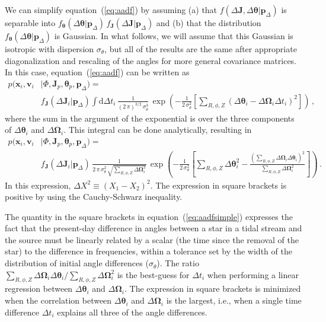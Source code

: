 \documentclass[12pt,preprint]{aastex}
\newcommand{\ie}{i.e.}
\newcommand{\dd}{\mathrm{d}}
\newcommand{\eqnname}{equation}
\renewcommand{\vec}[1]{\ensuremath{\mathbf{#1}}}
\newcommand{\vecx}{\ensuremath{\vec{x}}}
\newcommand{\vecv}{\ensuremath{\vec{v}}}
\newcommand{\vecj}{\ensuremath{\vec{J}}}
\newcommand{\veco}{\ensuremath{\vec{\Omega}}}
\newcommand{\veca}{\ensuremath{\boldsymbol\theta}}
\newcommand{\paramsdiff}{\ensuremath{\vec{p}_\Delta}}
\begin{document}
We can simplify \eqnname~(\ref{eq:aadf}) by assuming (a) that
$f(\Delta \vecj,\Delta \veca|\paramsdiff)$ is separable into
$f_{\veca}(\Delta \veca|\paramsdiff)\,f_{\vecj}(\Delta
\vecj|\paramsdiff)$ and (b) that the distribution $f_{\veca}(\Delta
\veca|\paramsdiff)$ is Gaussian. In what follows, we will assume that
this Gaussian is isotropic with dispersion $\sigma_\theta$, but all of
the results are the same after appropriate diagonalization and
rescaling of the angles for more general covariance matrices. In this
case, \eqnname~(\ref{eq:aadf}) can be written as
\begin{equation}
\begin{split}
  p(\vecx_i,\vecv_i & | \Phi,\vecj_p,\veca_p,\paramsdiff) 
   = \\
   & f_{\vecj}(\Delta \vecj_i|\paramsdiff) \int \dd \Delta t_i\,
  \frac{1}{(2\,\pi)^{3/2}\,\sigma_\theta^3}\,\exp\left(-\frac{1}{2\,\sigma_\theta^2}\left[\sum_{R,\phi,Z}\left(\Delta \veca_i-\Delta \veco_i\Delta t_i\right)^2\right]\right)\,,
\end{split}
\end{equation}
where the sum in the argument of the exponential is over the three
components of $\Delta \veca_i$ and $\Delta \veco_i$. This integral can
be done analytically, resulting in
\begin{equation}\label{eq:aadfsimple}
\begin{split}
  p(\vecx_i,\vecv_i & | \Phi,\vecj_p,\veca_p,\paramsdiff) 
   = \\
   & f_{\vecj}(\Delta \vecj_i|\paramsdiff) \,  \frac{1}{2\,\pi\,\sigma_\theta^2\,\sqrt{\sum_{R,\phi,Z}\Delta \veco_i^2}}\,\exp\left(-\frac{1}{2\,\sigma_\theta^2}\left[\sum_{R,\phi,Z}\Delta \veca^2_i-\frac{\left(\sum_{R,\phi,Z} \Delta \veco_i\Delta \veca_i\right)^2}{\sum_{R,\phi,Z}\Delta \veco_i^2}\right]\right)\,.
\end{split}
\end{equation}
In this expression, $\Delta X^2 \equiv (X_1-X_2)^2$. The expression in
square brackets is positive by using the Cauchy-Schwarz inequality. 

The quantity in the square brackets in \eqnname~(\ref{eq:aadfsimple})
expresses the fact that the present-day difference in angles between a
star in a tidal stream and the source must be linearly related by a
scalar (the time since the removal of the star) to the difference in
frequencies, within a tolerance set by the width of the distribution
of initial angle differences ($\sigma_\theta$). The ratio
$\sum_{R,\phi,Z} \Delta \veco_i\Delta \veca_i/\sum_{R,\phi,Z}\Delta
\veco_i^2$ is the best-guess for $\Delta t_i$ when performing a linear
regression between $\Delta \veca_i$ and $\Delta \veco_i$. The
expression in square brackets is minimized when the correlation
between $\Delta \veca_i$ and $\Delta \veco_i$ is the largest, \ie,
when a single time difference $\Delta t_i$ explains all three of the
angle differences.
\end{document}
